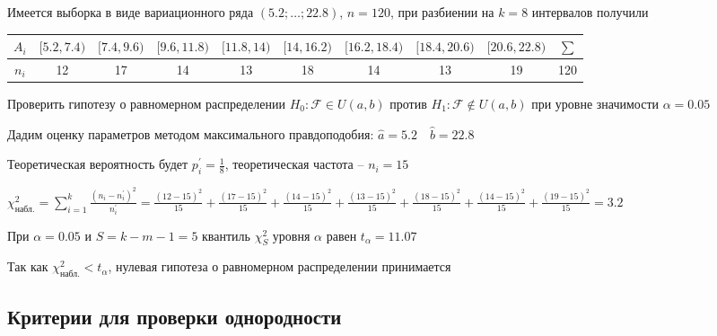 \Ex Имеется выборка в виде вариационного ряда $(5.2; \dots; 22.8)$, $n = 120$, при разбиении на $k = 8$ интервалов получили

\begin{tabular}{c|c|c|c|c|c|c|c|c|c}
    $A_i$ & $[5.2, 7.4)$ & $[7.4, 9.6)$ & $[9.6, 11.8)$ & $[11.8, 14)$ & $[14, 16.2)$ & $[16.2, 18.4)$ & $[18.4, 20.6)$ & $[20.6, 22.8)$ & $\sum$ \\
    \hline
    $n_i$ & 12 & 17 & 14 & 13 & 18 & 14 & 13 & 19 & 120
\end{tabular}

Проверить гипотезу о равномерном распределении $H_0 : \mathcal{F} \in U(a, b)$ против $H_1 : \mathcal{F} \not\in U(a, b)$ при уровне значимости $\alpha = 0.05$

Дадим оценку параметров методом максимального правдоподобия: $\hat a = 5.2 \quad \hat b = 22.8$

Теоретическая вероятность будет $p_i^\prime = \frac{1}{8}$, теоретическая частота -- $n_i = 15$

$\chi^2_\text{набл.} = \sum_{i = 1}^k \frac{(n_i - n_i^\prime)^2}{n_i^\prime} = \frac{(12 - 15)^2}{15} + 
\frac{(17 - 15)^2}{15} + \frac{(14 - 15)^2}{15} + \frac{(13 - 15)^2}{15} + \frac{(18 - 15)^2}{15} + 
\frac{(14 - 15)^2}{15} + \frac{(19 - 15)^2}{15} = 3.2$

При $\alpha = 0.05$ и $S = k - m - 1 = 5$ квантиль $\chi^2_S$ уровня $\alpha$ равен $t_\alpha = 11.07$

Так как $\chi^2_\text{набл.} < t_\alpha$, нулевая гипотеза о равномерном распределении принимается

\subsection{Критерии для проверки однородности}

